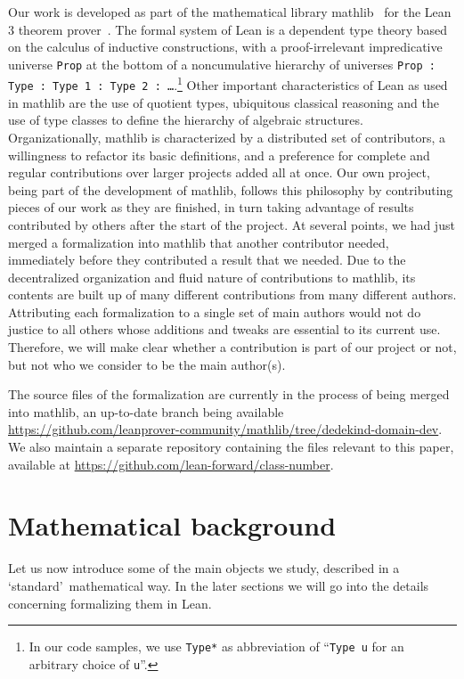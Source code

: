 \documentclass[a4paper,USenglish,cleveref, autoref, thm-restate]{lipics-v2021}
\newcommand{\lean}[1]{\texttt{#1}\xspace} %
\newcommand{\mathlib}{\textsf{mathlib}\xspace}
\begin{document}
Our work is developed as part of the mathematical library \mathlib~\cite{mathlib} for the Lean 3 theorem prover~\cite{lean-prover}.
The formal system of Lean is a dependent type theory based on the calculus of inductive constructions,
with a proof-irrelevant impredicative universe \lean{Prop} at the bottom of a noncumulative hierarchy of universes \lean{Prop : Type : Type 1 : Type 2 : \dots}.\footnote{In our code samples, we use \lean{Type*} as abbreviation of ``\lean{Type u} for an arbitrary choice of \lean{u}''.}
Other important characteristics of Lean as used in \mathlib are the use of quotient types, ubiquitous classical reasoning and the use of type classes to define the hierarchy of algebraic structures.
Organizationally, \mathlib is characterized by a distributed set of contributors, a willingness to refactor its basic definitions, and a preference for complete and regular contributions over larger projects added all at once.
Our own project, being part of the development of \mathlib, follows this philosophy by contributing pieces of our work as they are finished,
in turn taking advantage of results contributed by others after the start of the project.
At several points, we had just merged a formalization into \mathlib that another contributor needed,
immediately before they contributed a result that we needed.
Due to the decentralized organization and fluid nature of contributions to mathlib, its contents are built up of many different contributions from many different authors. Attributing each formalization to a single set of main authors would not do justice to all others whose additions and tweaks are essential to its current use. Therefore, we will make clear whether a contribution is part of our project or not, but not who we consider to be the main author(s).

The source files of the formalization are currently in the process of being merged into \mathlib, an up-to-date branch being available \url{https://github.com/leanprover-community/mathlib/tree/dedekind-domain-dev}. We also maintain a separate repository containing the files relevant to this paper, available at \url{https://github.com/lean-forward/class-number}.

\section{Mathematical background}\label{sec math background}

Let us now introduce some of the main objects we study, described in a \lq standard\rq\ mathematical way. In the later sections we will go into the details concerning formalizing them in Lean.
\end{document}
